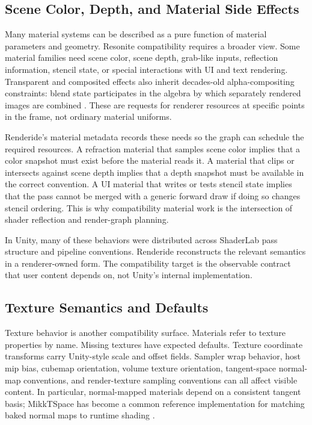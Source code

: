 \documentclass[acmtog,screen,nonacm]{acmart}
\begin{document}
\subsection{Scene Color, Depth, and Material Side Effects}

Many material systems can be described as a pure function of material parameters and geometry. Resonite compatibility requires a broader view. Some material families need scene color, scene depth, grab-like inputs, reflection information, stencil state, or special interactions with UI and text rendering. Transparent and composited effects also inherit decades-old alpha-compositing constraints: blend state participates in the algebra by which separately rendered images are combined \citep{porterDuff1984compositing,unityShaderLabBlend}. These are requests for renderer resources at specific points in the frame, not ordinary material uniforms.

Renderide's material metadata records these needs so the graph can schedule the required resources. A refraction material that samples scene color implies that a color snapshot must exist before the material reads it. A material that clips or intersects against scene depth implies that a depth snapshot must be available in the correct convention. A UI material that writes or tests stencil state implies that the pass cannot be merged with a generic forward draw if doing so changes stencil ordering. This is why compatibility material work is the intersection of shader reflection and render-graph planning.

In Unity, many of these behaviors were distributed across ShaderLab pass structure and pipeline conventions. Renderide reconstructs the relevant semantics in a renderer-owned form. The compatibility target is the observable contract that user content depends on, not Unity's internal implementation.

\subsection{Texture Semantics and Defaults}

Texture behavior is another compatibility surface. Materials refer to texture properties by name. Missing textures have expected defaults. Texture coordinate transforms carry Unity-style scale and offset fields. Sampler wrap behavior, host mip bias, cubemap orientation, volume texture orientation, tangent-space normal-map conventions, and render-texture sampling conventions can all affect visible content. In particular, normal-mapped materials depend on a consistent tangent basis; MikkTSpace has become a common reference implementation for matching baked normal maps to runtime shading \citep{mikktspaceRepo}.
\end{document}
